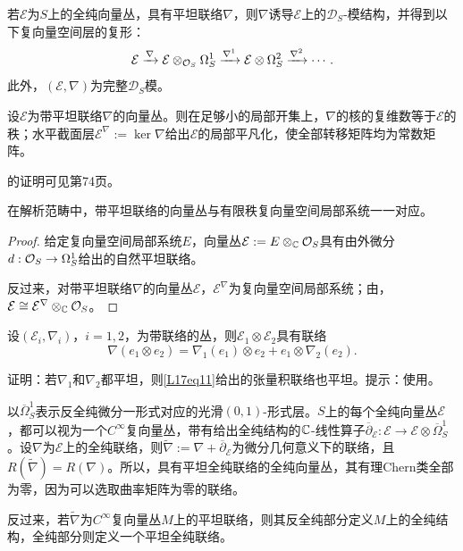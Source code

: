\begin{note}[L17S1O2]
若$\mathcal E$为$S$上的全纯向量丛，具有平坦联络$\nabla$，则$\nabla$诱导$\mathcal E$上的$\mathcal D_S$-模结构，并得到以下复向量空间层的复形：
\[\mathcal E\xrightarrow{\nabla}\mathcal E\otimes_{\mathcal O_S}\Omega_S^1\xrightarrow{\nabla^1}\mathcal E\otimes\Omega_S^2\xrightarrow{\nabla^2}\cdots.\]
此外，$(\mathcal E,\nabla)$为完整$\mathcal D_S$模。
\end{note}
\begin{proposition}\label{L17S1O3}
设$\mathcal E$为带平坦联络$\nabla$的向量丛。则在足够小的局部开集上，$\nabla$的核的复维数等于$\mathcal E$的秩；水平截面层$\mathcal E^\nabla:=\ker\nabla$给出$\mathcal E$的局部平凡化，使全部转移矩阵均为常数矩阵。
\end{proposition}
的证明可见第74页。
\begin{corollary}\label{L17S1O4}
在解析范畴中，带平坦联络的向量丛与有限秩复向量空间局部系统一一对应。
\end{corollary}
\begin{proof}
给定复向量空间局部系统$E$，向量丛$\mathcal E:=E\otimes_{\mathbb{C}}\mathcal O_S$具有由外微分$d:\mathcal O_S\to\Omega_S^1$给出的自然平坦联络。

反过来，对带平坦联络$\nabla$的向量丛$\mathcal E$，$\mathcal E^\nabla$为复向量空间局部系统；由，$\mathcal E\cong\mathcal E^\nabla\otimes_{\mathbb{C}}\mathcal O_S$。
\end{proof}
设$(\mathcal E_i,\nabla_i)$，$i=1,2$，为带联络的丛，则$\mathcal E_1\otimes\mathcal E_2$具有联络
\begin{equation}\tag{1.1}\label{L17eq11}\nabla(e_1\otimes e_2)=\nabla_1(e_1)\otimes e_2+e_1\otimes\nabla_2(e_2).\end{equation}
\begin{exercise*}\label{L17S1Ex1}
证明：若$\nabla_1$和$\nabla_2$都平坦，则\eqref{L17eq11}给出的张量积联络也平坦。提示：使用。
\end{exercise*}
\begin{note}[L17S1O5]
以$\overline\Omega_S^1$表示反全纯微分一形式对应的光滑$(0,1)$-形式层。$S$上的每个全纯向量丛$\mathcal E$，都可以视为一个$C^\infty$复向量丛，带有给出全纯结构的$\mathbb{C}$-线性算子$\overline\partial_{\mathcal E}:\mathcal E\to\mathcal E\otimes\overline\Omega_S^1$。设$\nabla$为$\mathcal E$上的全纯联络，则$\widetilde\nabla:=\nabla+\overline\partial_{\mathcal E}$为微分几何意义下的联络，且$R(\widetilde\nabla)=R(\nabla)$。所以，具有平坦全纯联络的全纯向量丛，其有理Chern类全部为零，因为可以选取曲率矩阵为零的联络。

反过来，若$\widetilde\nabla$为$C^\infty$复向量丛$M$上的平坦联络，则其反全纯部分定义$M$上的全纯结构，全纯部分则定义一个平坦全纯联络。
\end{note}
